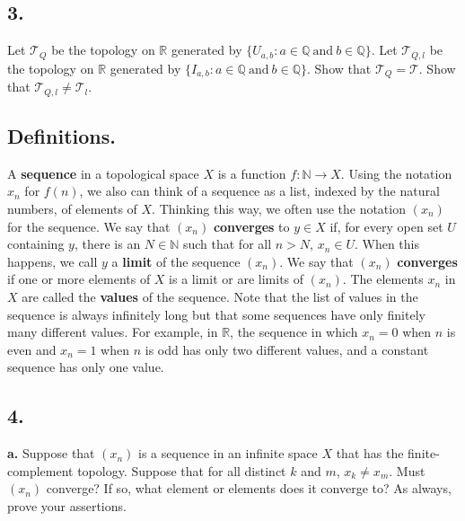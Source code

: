 \documentclass{amsart}
\theoremstyle{plain}
\theoremstyle{definition}
\theoremstyle{remark}
\begin{document}
\vspace{.15in}

\noindent
\subsection*{3.}  Let $\mathcal T _Q$ be the topology on $\mathbb R$ generated by $\{ U_{a, b} : a\in \mathbb Q \ \mbox{and} \ b\in \mathbb Q \}$. Let $\mathcal T _{Q,l}$ be the topology on $\mathbb R$ generated by $\{ I_{a, b} : a\in \mathbb Q \ \mbox{and} \ b\in \mathbb Q \}$. Show that $\mathcal T _Q = \mathcal T$. Show that $\mathcal T _{Q,l} \ne \mathcal T _l$.

\vspace{.15in}

\subsection*{Definitions.} A {\bfseries sequence} in a topological space $X$ is a function $f : \mathbb N \rightarrow X$. Using the notation $x_n$ for $f(n)$, we also can think of a sequence as a list, indexed by the natural numbers, of elements of $X$. Thinking this way, we often use the notation $(x_n)$ for the sequence. We say that $(x_n)$ {\bfseries converges} to $y\in X$ if, for every open set $U$ containing $y$, there is an $N\in \mathbb N$ such that for all $n > N$, $x_n \in U$. When this happens, we call $y$ a {\bfseries limit} of the sequence $(x_n)$. We say that $(x_n)$ {\bfseries converges} if one or more elements of $X$ is a limit or are limits of $(x_n)$. The elements $x_n$ in $X$ are called the {\bfseries values} of the sequence. Note that the list of values in the sequence is always infinitely long but that some sequences have only finitely many different values. For example, in $\mathbb R$, the sequence in which $x_n = 0$ when $n$ is even and $x_n = 1$ when $n$ is odd has only two different values, and a constant sequence has only one value.

\vspace{.15in}

\noindent
\subsection*{4.}

{\bfseries a.} Suppose that $(x_n)$ is a sequence in an infinite space $X$ that has the finite-complement topology. Suppose that for all distinct $k$ and $m$, $x_k\ne x_m$. Must $(x_n)$ converge? If so, what element or elements does it converge to? As always, prove your assertions.
\end{document}

